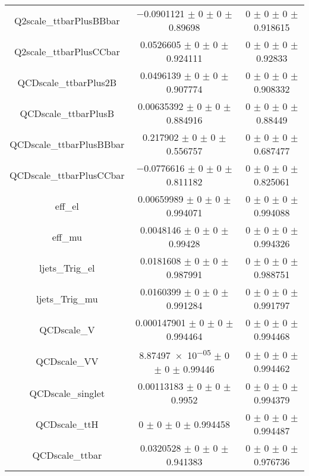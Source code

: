 \begin{table}
\begin{tabular}{ccc}
Q2scale\_ttbarPlusBBbar & \num{-0.0901121} $\pm$ \num{0} $\pm$ \num{0} $\pm$ \num{0.89698} & \num{0} $\pm$ \num{0} $\pm$ \num{0} $\pm$ \num{0.918615}\\
Q2scale\_ttbarPlusCCbar & \num{0.0526605} $\pm$ \num{0} $\pm$ \num{0} $\pm$ \num{0.924111} & \num{0} $\pm$ \num{0} $\pm$ \num{0} $\pm$ \num{0.92833}\\
QCDscale\_ttbarPlus2B & \num{0.0496139} $\pm$ \num{0} $\pm$ \num{0} $\pm$ \num{0.907774} & \num{0} $\pm$ \num{0} $\pm$ \num{0} $\pm$ \num{0.908332}\\
QCDscale\_ttbarPlusB & \num{0.00635392} $\pm$ \num{0} $\pm$ \num{0} $\pm$ \num{0.884916} & \num{0} $\pm$ \num{0} $\pm$ \num{0} $\pm$ \num{0.88449}\\
QCDscale\_ttbarPlusBBbar & \num{0.217902} $\pm$ \num{0} $\pm$ \num{0} $\pm$ \num{0.556757} & \num{0} $\pm$ \num{0} $\pm$ \num{0} $\pm$ \num{0.687477}\\
QCDscale\_ttbarPlusCCbar & \num{-0.0776616} $\pm$ \num{0} $\pm$ \num{0} $\pm$ \num{0.811182} & \num{0} $\pm$ \num{0} $\pm$ \num{0} $\pm$ \num{0.825061}\\
eff\_el & \num{0.00659989} $\pm$ \num{0} $\pm$ \num{0} $\pm$ \num{0.994071} & \num{0} $\pm$ \num{0} $\pm$ \num{0} $\pm$ \num{0.994088}\\
eff\_mu & \num{0.0048146} $\pm$ \num{0} $\pm$ \num{0} $\pm$ \num{0.99428} & \num{0} $\pm$ \num{0} $\pm$ \num{0} $\pm$ \num{0.994326}\\
ljets\_Trig\_el & \num{0.0181608} $\pm$ \num{0} $\pm$ \num{0} $\pm$ \num{0.987991} & \num{0} $\pm$ \num{0} $\pm$ \num{0} $\pm$ \num{0.988751}\\
ljets\_Trig\_mu & \num{0.0160399} $\pm$ \num{0} $\pm$ \num{0} $\pm$ \num{0.991284} & \num{0} $\pm$ \num{0} $\pm$ \num{0} $\pm$ \num{0.991797}\\
QCDscale\_V & \num{0.000147901} $\pm$ \num{0} $\pm$ \num{0} $\pm$ \num{0.994464} & \num{0} $\pm$ \num{0} $\pm$ \num{0} $\pm$ \num{0.994468}\\
QCDscale\_VV & \num{8.87497e-05} $\pm$ \num{0} $\pm$ \num{0} $\pm$ \num{0.99446} & \num{0} $\pm$ \num{0} $\pm$ \num{0} $\pm$ \num{0.994462}\\
QCDscale\_singlet & \num{0.00113183} $\pm$ \num{0} $\pm$ \num{0} $\pm$ \num{0.9952} & \num{0} $\pm$ \num{0} $\pm$ \num{0} $\pm$ \num{0.994379}\\
QCDscale\_ttH & \num{0} $\pm$ \num{0} $\pm$ \num{0} $\pm$ \num{0.994458} & \num{0} $\pm$ \num{0} $\pm$ \num{0} $\pm$ \num{0.994487}\\
QCDscale\_ttbar & \num{0.0320528} $\pm$ \num{0} $\pm$ \num{0} $\pm$ \num{0.941383} & \num{0} $\pm$ \num{0} $\pm$ \num{0} $\pm$ \num{0.976736}\\

\end{tabular}
\end{table}

